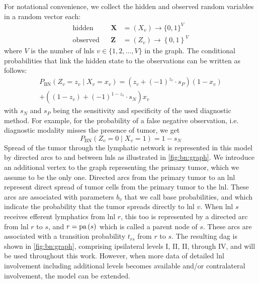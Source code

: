 \documentclass[\relativeRoot/main.tex]{subfiles}
\begin{document}
For notational convenience, we collect the hidden and observed random variables in a random vector each:
%
\begin{equation} \label{eq:bn:variables}
    \begin{aligned}
        \text{hidden}& & \mathbf{X} &= ( X_v ) \rightarrow \{ 0,1 \}^V \\
        \text{observed}& & \mathbf{Z} &= ( Z_v ) \rightarrow \left\{ 0, 1 \right\}^V
    \end{aligned}
\end{equation}
%
where $V$ is the number of \glspl{lnl} $v \in \{ 1,2,\ldots,V \}$ in the graph. The conditional probabilities that link the hidden state to the observations can be written as follows:
%
\begin{multline}
    P_\text{BN} \left( Z_v = z_v \mid X_v = x_v \right) = \left( z_v + (-1)^{z_v} \cdot s_P \right)(1 - x_v) \\ 
    + \left( (1 - z_v) + (-1)^{1 - z_v} \cdot s_N \right) x_v
\end{multline}
%
with $s_N$ and $s_P$ being the sensitivity and specificity of the used diagnostic method. For example, for the probability of a false negative observation, i.e. diagnostic modality misses the presence of tumor, we get
%
\begin{equation}
    P_\text{BN} \left( Z_v = 0 \mid X_v = 1 \right) = 1 - s_N
\end{equation}
%
Spread of the tumor through the lymphatic network is represented in this model by directed arcs to and between \glspl{lnl} as illustrated in \cref{fig:bn:graph}. We introduce an additional vertex to the graph representing the primary tumor, which we assume to be the only one. Directed arcs from the primary tumor to an \gls{lnl} represent direct spread of tumor cells from the primary tumor to the \gls{lnl}. These arcs are associated with parameters $b_v$ that we call base probabilities, and which indicate the probability that the tumor spreads directly to \gls{lnl} $v$. When \gls{lnl} $s$ receives efferent lymphatics from \gls{lnl} $r$, this too is represented by a directed arc from \gls{lnl} $r$ to $s$, and $r=\operatorname{pa}{(s)}$ which is called a parent node of $s$. These arcs are associated with a transition probability $t_{rs}$ from $r$ to $s$. The resulting \gls{dag} is shown in \cref{fig:bn:graph}, comprising ipsilateral levels I, II, II, through IV, and will be used throughout this work. However, when more data of detailed \gls{lnl} involvement including additional levels becomes available and/or contralateral involvement, the model can be extended.
\end{document}
